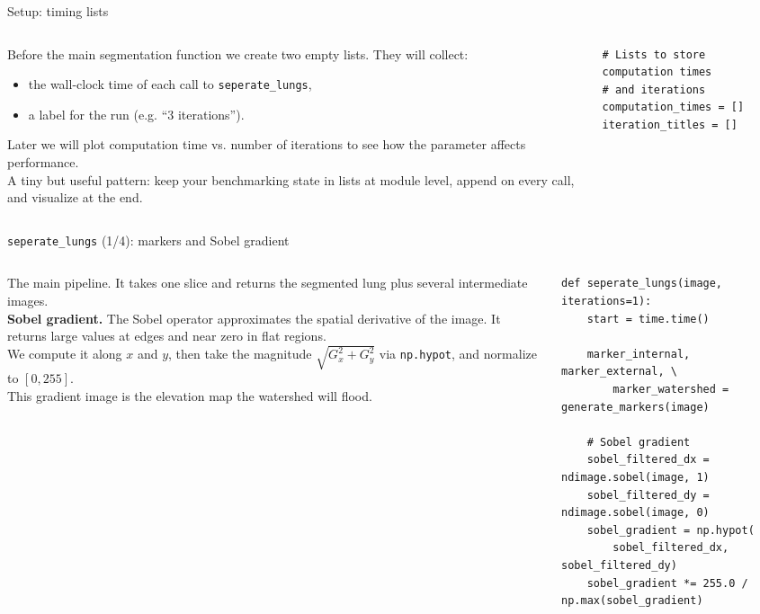 \documentclass[10pt,aspectratio=169]{beamer}
\begin{document}
\begin{frame}[fragile]{Setup: timing lists}
\begin{columns}[T,onlytextwidth]
\begin{column}{0.42\textwidth}
\small
Before the main segmentation function we create two empty lists. They will collect:
\begin{itemize}
  \item the wall-clock time of each call to \texttt{seperate\_lungs},
  \item a label for the run (e.g. ``3 iterations'').
\end{itemize}
Later we will plot computation time vs. number of iterations to see how the parameter affects performance.\\[0.4em]
A tiny but useful pattern: keep your benchmarking state in lists at module level, append on every call, and visualize at the end.
\end{column}
\begin{column}{0.56\textwidth}
\begin{lstlisting}[firstnumber=last]
# Lists to store computation times
# and iterations
computation_times = []
iteration_titles = []
\end{lstlisting}
\end{column}
\end{columns}
\end{frame}

\begin{frame}[fragile]{\texttt{seperate\_lungs} (1/4): markers and Sobel gradient}
\begin{columns}[T,onlytextwidth]
\begin{column}{0.42\textwidth}
\small
The main pipeline. It takes one slice and returns the segmented lung plus several intermediate images.\\[0.4em]
\textbf{Sobel gradient.} The Sobel operator approximates the spatial derivative of the image. It returns large values at edges and near zero in flat regions.\\[0.4em]
We compute it along $x$ and $y$, then take the magnitude $\sqrt{G_x^2 + G_y^2}$ via \texttt{np.hypot}, and normalize to $[0, 255]$.\\[0.4em]
This gradient image is the elevation map the watershed will flood.
\end{column}
\begin{column}{0.56\textwidth}
\begin{lstlisting}[firstnumber=last]
def seperate_lungs(image, iterations=1):
    start = time.time()

    marker_internal, marker_external, \
        marker_watershed = generate_markers(image)

    # Sobel gradient
    sobel_filtered_dx = ndimage.sobel(image, 1)
    sobel_filtered_dy = ndimage.sobel(image, 0)
    sobel_gradient = np.hypot(
        sobel_filtered_dx, sobel_filtered_dy)
    sobel_gradient *= 255.0 / np.max(sobel_gradient)
\end{lstlisting}
\end{column}
\end{columns}
\end{frame}
\end{document}

